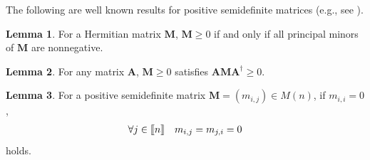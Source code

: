 \documentclass[reprint,amsmath,amssymb,aps,]{revtex4-2}
\theoremstyle{definition}
\newtheorem{lem}{Lemma}
\newcommand{\1}{\mbox{1}\hspace{-0.25em}\mbox{l}}%
\newcommand{\setint}[1]{[\hspace{-0.5mm}[#1]\hspace{-0.5mm}]}
\newcommand{\mat}[1]{\mathbf{#1}}
\begin{document}
The following are  well known results for positive semidefinite matrices
(e.g., see \cite{horn1985matrix}).

\begin{lem}
  \label{lem:hansei}
  For a Hermitian matrix $\mat{M}$,
  $\mat{M} \ge 0$
  if and only if
  all principal minors of $\mat{M}$ are nonnegative.
\end{lem}

\begin{lem}
  \label{lem:sub_seitei_kai}
  For any matrix $\mat{A}$,
  $\mat{M} \ge 0$ satisfies
  $\mat{A} \mat{M} \mat{A}^\dagger \ge 0$.
\end{lem}

\begin{lem}
  \label{lem:px=0->cxy=0}
  For a positive semidefinite matrix $\mat{M} = (m_{i,j}) \in M(n)$,
  if $m_{i,i} = 0$,
  \begin{align*}
    \forall j \in \setint{n}
    ~~~
    m_{i,j} = m_{j,i} = 0
  \end{align*}
  holds.
\end{lem}
\end{document}
